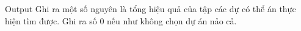 Output
Ghi ra một số nguyên là tổng hiệu quả của tập các dự có thể án thực hiện tìm được. Ghi ra số 0 nếu như không chọn dự án nảo cả.